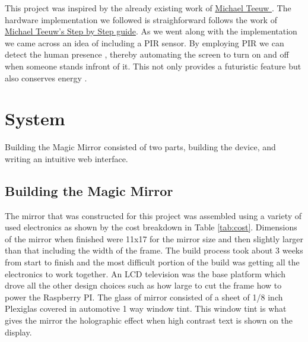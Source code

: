 \documentclass[conference]{IEEEtran}
\begin{document}
This project was inspired by the already existing work of \href{michaelteeuw.nl}{ Michael Teeuw } . The hardware implementation we followed is straighforward follows the work of  \href{http://michaelteeuw.nl/post/80391333672/magic-mirror-part-i-the-idea-the-mirror}{Michael Teeuw's Step by Step guide}. As we went along with the implementation we came across an idea of including a PIR sensor. By employing PIR we can detect the human presence , thereby automating the screen to turn on and off when someone stands infront of it. This not only provides a futuristic feature but also conserves energy . 


\section{System} 
Building the Magic Mirror consisted of two parts, building the device, and writing an intuitive web interface.
\subsection{Building the Magic Mirror}
The mirror that was constructed for this project was assembled using a variety of used electronics as shown by the cost breakdown in Table \ref{tab:cost}.
Dimensions of the mirror when finished were 11x17 for the mirror size and then slightly larger than that including the width of the frame.
The build process took about 3 weeks from start to finish and the most difficult portion of the build was getting all the electronics to work together.
An LCD television was the base platform which drove all the other design choices such as how large to cut the frame how to power the Raspberry PI.
The glass of mirror consisted of a sheet of 1/8 inch Plexiglas covered in automotive 1 way window tint.
This window tint is what gives the mirror the holographic effect when high contrast text is shown on the display.
\end{document}
